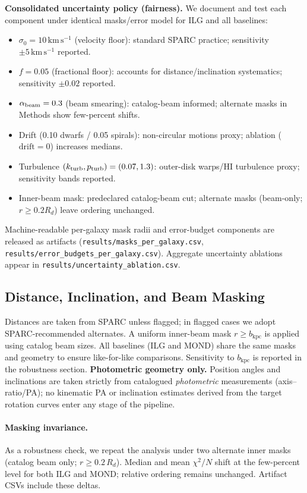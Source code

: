 \documentclass[usenatbib]{mnras}
\begin{document}
\noindent\textbf{Consolidated uncertainty policy (fairness).} We document and test each component under identical masks/error model for ILG and all baselines:
\begin{itemize}
  \item $\sigma_0=10\,\mathrm{km\,s^{-1}}$ (velocity floor): standard SPARC practice; sensitivity $\pm 5\,\mathrm{km\,s^{-1}}$ reported.
  \item $f=0.05$ (fractional floor): accounts for distance/inclination systematics; sensitivity $\pm0.02$ reported.
  \item $\alpha_{\rm beam}=0.3$ (beam smearing): catalog-beam informed; alternate masks in Methods show few-percent shifts.
  \item Drift (0.10 dwarfs / 0.05 spirals): non-circular motions proxy; ablation ($\mathrm{drift}=0$) increases medians.
  \item Turbulence $(k_{\rm turb},p_{\rm turb})=(0.07,1.3)$: outer-disk warps/HI turbulence proxy; sensitivity bands reported.
  \item Inner-beam mask: predeclared catalog-beam cut; alternate masks (beam-only; $r\ge0.2R_d$) leave ordering unchanged.
\end{itemize}
Machine-readable per-galaxy mask radii and error-budget components are released as artifacts (\texttt{results/masks\_per\_galaxy.csv}, \texttt{results/error\_budgets\_per\_galaxy.csv}). Aggregate uncertainty ablations appear in \texttt{results/uncertainty\_ablation.csv}.

\subsection{Distance, Inclination, and Beam Masking}
\noindent Distances are taken from SPARC unless flagged; in flagged cases we adopt SPARC-recommended alternates. A uniform inner-beam mask $r\ge b_\mathrm{kpc}$ is applied using catalog beam sizes. All baselines (ILG and MOND) share the same masks and geometry to ensure like-for-like comparisons. Sensitivity to $b_\mathrm{kpc}$ is reported in the robustness section.
\noindent\textbf{Photometric geometry only.} Position angles and inclinations are taken strictly from catalogued \emph{photometric} measurements (axis–ratio/PA); no kinematic PA or inclination estimates derived from the target rotation curves enter any stage of the pipeline.
\paragraph{Masking invariance.} As a robustness check, we repeat the analysis under two alternate inner masks (catalog beam only; $r\ge 0.2\,R_d$). Median and mean $\chi^2/N$ shift at the few-percent level for both ILG and MOND; relative ordering remains unchanged. Artifact CSVs include these deltas.
\end{document}
